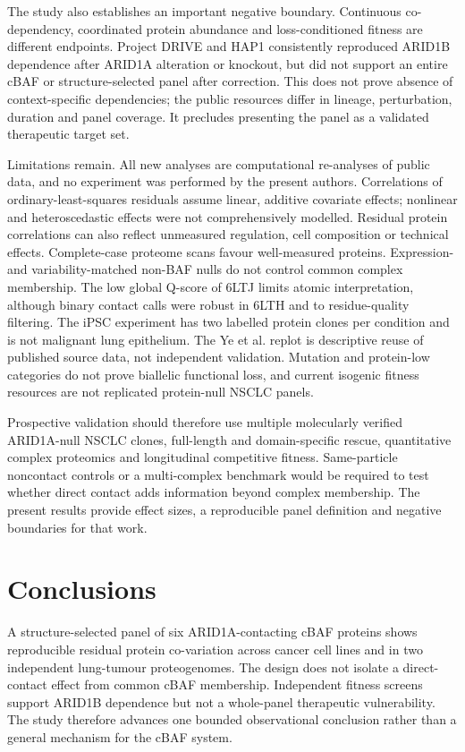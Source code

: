 \documentclass[journal=jprobs,manuscript=article,layout=traditional]{achemso}
\begin{document}
The study also establishes an important negative boundary. Continuous co-dependency, coordinated protein abundance and loss-conditioned fitness are different endpoints. Project DRIVE and HAP1 consistently reproduced ARID1B dependence after ARID1A alteration or knockout, but did not support an entire cBAF or structure-selected panel after correction. This does not prove absence of context-specific dependencies; the public resources differ in lineage, perturbation, duration and panel coverage. It precludes presenting the panel as a validated therapeutic target set.

Limitations remain. All new analyses are computational re-analyses of public data, and no experiment was performed by the present authors. Correlations of ordinary-least-squares residuals assume linear, additive covariate effects; nonlinear and heteroscedastic effects were not comprehensively modelled. Residual protein correlations can also reflect unmeasured regulation, cell composition or technical effects. Complete-case proteome scans favour well-measured proteins. Expression- and variability-matched non-BAF nulls do not control common complex membership. The low global Q-score of 6LTJ limits atomic interpretation, although binary contact calls were robust in 6LTH and to residue-quality filtering. The iPSC experiment has two labelled protein clones per condition and is not malignant lung epithelium. The Ye et al. replot is descriptive reuse of published source data, not independent validation. Mutation and protein-low categories do not prove biallelic functional loss, and current isogenic fitness resources are not replicated protein-null NSCLC panels.

Prospective validation should therefore use multiple molecularly verified ARID1A-null NSCLC clones, full-length and domain-specific rescue, quantitative complex proteomics and longitudinal competitive fitness. Same-particle noncontact controls or a multi-complex benchmark would be required to test whether direct contact adds information beyond complex membership. The present results provide effect sizes, a reproducible panel definition and negative boundaries for that work.

\section{Conclusions}

A structure-selected panel of six ARID1A-contacting cBAF proteins shows reproducible residual protein co-variation across cancer cell lines and in two independent lung-tumour proteogenomes. The design does not isolate a direct-contact effect from common cBAF membership. Independent fitness screens support ARID1B dependence but not a whole-panel therapeutic vulnerability. The study therefore advances one bounded observational conclusion rather than a general mechanism for the cBAF system.
\end{document}
